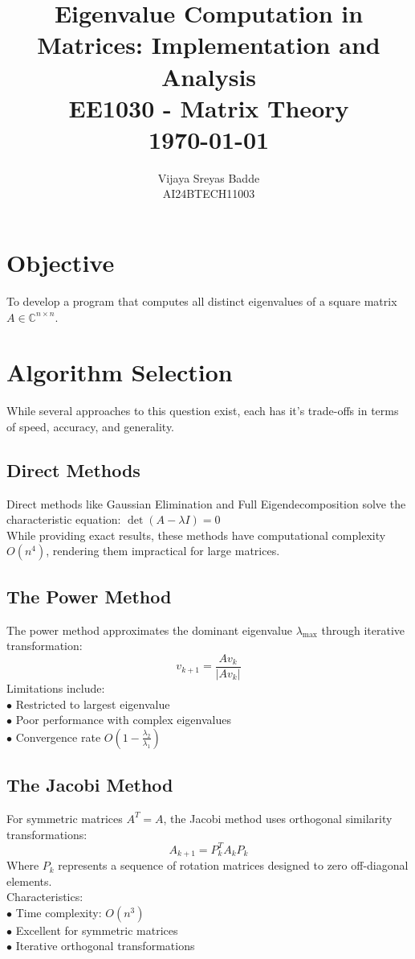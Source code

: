 \documentclass[a4paper,12pt]{article}
\title{
    \vspace{2cm} %
    \textbf{\Huge Eigenvalue Computation in Matrices: Implementation and Analysis} \\
    \vspace{1cm} %
    \large EE1030 - Matrix Theory \\
    \vspace{0.5cm} %
    \large \today
}
\author{Vijaya Sreyas Badde\\ \small AI24BTECH11003}
\date{}
\begin{document}
\maketitle
\thispagestyle{empty}
\newpage

\setcounter{page}{1}  %
\tableofcontents
\newpage

\section{Objective}
\label{target}
To develop a program that computes all distinct eigenvalues of a square matrix $A \in \mathbb{C}^{n \times n}$.

\section{Algorithm Selection}
\label{algo-sel}
While several approaches to this question exist, each has it's trade-offs in terms of speed, accuracy, and generality.

\subsection{Direct Methods}
\label{dir-meth}
    Direct methods like Gaussian Elimination and Full Eigendecomposition solve the characteristic equation: $\det(A - \lambda I) = 0$\\
While providing exact results, these methods have computational complexity $O(n^4)$, rendering them impractical for large matrices.

\subsection{The Power Method}
\label{pow-meth}
    The power method approximates the dominant eigenvalue $\lambda_{\max}$ through iterative transformation: $$v_{k+1} = \frac{A v_k}{|A v_k|}$$
Limitations include:\\
$\bullet$ Restricted to largest eigenvalue\\
$\bullet$ Poor performance with complex eigenvalues\\
$\bullet$ Convergence rate $O(1 - \frac{\lambda_2}{\lambda_1})$

\subsection{The Jacobi Method}
\label{jac-math}
    For symmetric matrices $A^T = A$, the Jacobi method uses orthogonal similarity transformations: $$A_{k+1} = P_k^T A_k P_k$$
Where $P_k$ represents a sequence of rotation matrices designed to zero off-diagonal elements.\\
Characteristics:\\
$\bullet$ Time complexity: $O(n^3)$\\
$\bullet$ Excellent for symmetric matrices\\
$\bullet$ Iterative orthogonal transformations
\end{document}
